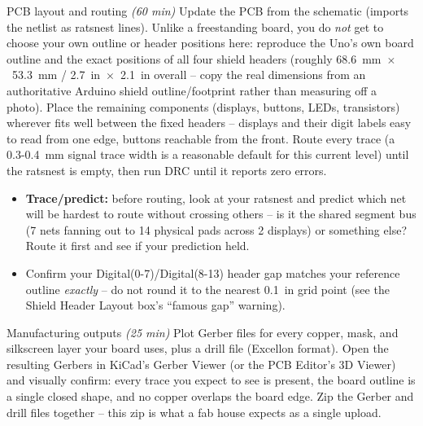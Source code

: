 \documentclass[11pt]{article}
\begin{document}
\begin{labexercise}{PCB layout and routing \hfill {\small \itshape (60 min)}}
Update the PCB from the schematic (imports the netlist as ratsnest lines). Unlike a
freestanding board, you do \emph{not} get to choose your own outline or header
positions here: reproduce the Uno's own board outline and the exact positions of
all four shield headers (roughly 68.6~mm~$\times$~53.3~mm / 2.7~in~$\times$~2.1~in
overall -- copy the real dimensions from an authoritative Arduino shield
outline/footprint rather than measuring off a photo). Place the remaining
components (displays, buttons, LEDs, transistors) wherever fits well between the
fixed headers -- displays and their digit labels easy to read from one edge,
buttons reachable from the front. Route every trace (a 0.3-0.4~mm signal trace
width is a reasonable default for this current level) until the ratsnest is empty,
then run DRC until it reports zero errors.
\begin{itemize}[nosep,leftmargin=*]
  \item \textbf{Trace/predict:} before routing, look at your ratsnest and predict
        which net will be hardest to route without crossing others -- is it the
        shared segment bus (7 nets fanning out to 14 physical pads across 2
        displays) or something else? Route it first and see if your prediction held.
  \item Confirm your Digital(0-7)/Digital(8-13) header gap matches your reference
        outline \emph{exactly} -- do not round it to the nearest 0.1~in grid
        point (see the Shield Header Layout box's ``famous gap'' warning).
\end{itemize}
\end{labexercise}

\begin{labexercise}{Manufacturing outputs \hfill {\small \itshape (25 min)}}
Plot Gerber files for every copper, mask, and silkscreen layer your board uses, plus
a drill file (Excellon format). Open the resulting Gerbers in KiCad's Gerber Viewer
(or the PCB Editor's 3D Viewer) and visually confirm: every trace you expect to see
is present, the board outline is a single closed shape, and no copper overlaps the
board edge. Zip the Gerber and drill files together -- this zip is what a fab house
expects as a single upload.
\end{labexercise}
\end{document}
